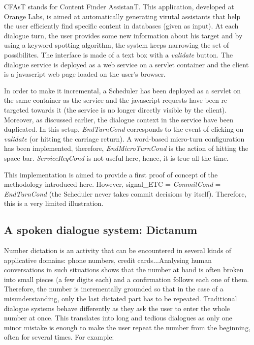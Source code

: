         CFAsT stands for Content Finder AssistanT. This application, developed at Orange Labs, is aimed at automatically generating virutal assistants that help the user efficiently find specific content in databases (given as input). At each dialogue turn, the user provides some new information about his target and by using a keyword spotting algorithm, the system keeps narrowing the set of possibilites. The interface is made of a text box with a \textit{validate} button. The dialogue service is deployed as a web service on a servlet container and the client is a javascript web page loaded on the user's browser.
        
        In order to make it incremental, a Scheduler has been deployed as a servlet on the same container as the service and the javascript requests have been re-targeted towards it (the service is no longer directly visible by the client). Moreover, as discussed earlier, the dialogue context in the service have been duplicated. In this setup, \textit{EndTurnCond} corresponds to the event of clicking on \textit{validate} (or hitting the carriage return). A word-based micro-turn configuration has been implemented, therefore, \textit{EndMicroTurnCond} is the action of hitting the space bar. \textit{ServiceReqCond} is not useful here, hence, it is true all the time.
        
        This implementation is aimed to provide a first proof of concept of the methodology introduced here. However, signal\_ETC = \textit{CommitCond} = \textit{EndTurnCond} (the Scheduler never takes commit decisions by itself). Therefore, this is a very limited illustration.
    
    \subsection{A spoken dialogue system: Dictanum}
    
    	Number dictation is an activity that can be encountered in several kinds of applicative domains: phone numbers, credit cards...Analysing human conversations in such situations shows that the number at hand is often broken into small pieces (a few digits each) and a confirmation follows each one of them. Therefore, the number is incrementally grounded so that in the case of a misunderstanding, only the last dictated part has to be repeated. Traditional dialogue systems behave differently as they ask the user to enter the whole number at once. This translates into long and tedious dialogues as only one minor mistake is enough to make the user repeat the number from the beginning, often for several times. For example:
        
